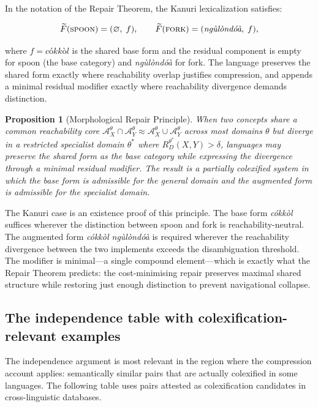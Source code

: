\documentclass[12pt]{article}
\theoremstyle{rthm}
\newtheorem{proposition}[theorem]{Proposition}
\theoremstyle{rdef}
\theoremstyle{remark}
\newcommand{\A}{\mathcal{A}}
\newcommand{\RD}[1][\theta]{R_{D}^{#1}}
\begin{document}
In the notation of the Repair Theorem, the Kanuri lexicalization satisfies:

\[
\widetilde{F}(\textsc{spoon}) = (\varnothing,\; f), \qquad
\widetilde{F}(\textsc{fork}) = (\textit{ng\`{u}l\`{o}nd\'{o}\`{a}},\; f),
\]

where $f = \textit{c\'{o}kk\`{o}l}$ is the shared base form and the residual
component is empty for spoon (the base category) and \textit{ng\`{u}l\`{o}nd\'{o}\`{a}}
for fork. The language preserves the shared form exactly where reachability
overlap justifies compression, and appends a minimal residual modifier exactly
where reachability divergence demands distinction.

\begin{proposition}[Morphological Repair Principle]
\label{prop:morph-repair}
When two concepts share a common reachability core
$\A_X^{\theta} \cap \A_Y^{\theta} \approx \A_X^{\theta} \cup \A_Y^{\theta}$
across most domains $\theta$ but diverge in a restricted specialist domain
$\theta^*$ where $\RD[\theta^*](X,Y) > \delta$, languages may preserve the
shared form as the base category while expressing the divergence through a
minimal residual modifier. The result is a partially colexified system in which
the base form is admissible for the general domain and the augmented form is
admissible for the specialist domain.
\end{proposition}

The Kanuri case is an existence proof of this principle. The base form
\textit{c\'{o}kk\`{o}l} suffices wherever the distinction between spoon and
fork is reachability-neutral. The augmented form \textit{c\'{o}kk\`{o}l
ng\`{u}l\`{o}nd\'{o}\`{a}} is required wherever the reachability divergence
between the two implements exceeds the disambiguation threshold. The modifier is
minimal---a single compound element---which is exactly what the Repair Theorem
predicts: the cost-minimising repair preserves maximal shared structure while
restoring just enough distinction to prevent navigational collapse.

\subsection{The independence table with colexification-relevant examples}

The independence argument is most relevant in the region where the compression
account applies: semantically similar pairs that are actually colexified in some
languages. The following table uses pairs attested as colexification candidates
in cross-linguistic databases.
\end{document}

